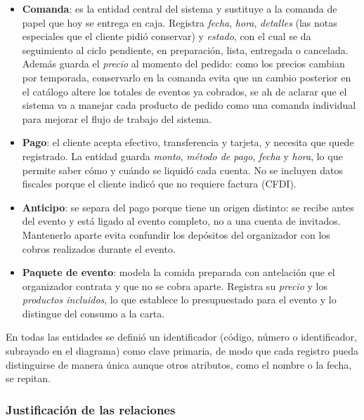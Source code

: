 \begin{itemize}
    \item \textbf{Comanda}: es la entidad central del sistema y sustituye a la comanda de papel que hoy se entrega en caja. Registra \emph{fecha}, \emph{hora}, \emph{detalles} (las notas especiales que el cliente pidió conservar) y \emph{estado}, con el cual se da seguimiento al ciclo pendiente, en preparación, lista, entregada o cancelada. Además guarda el \emph{precio} al momento del pedido: como los precios cambian por temporada, conservarlo en la comanda evita que un cambio posterior en el catálogo altere los totales de eventos ya cobrados, se ah de aclarar que el sistema va a manejar cada producto de pedido como una comanda individual para mejorar el flujo de trabajo del sistema.

    \item \textbf{Pago}: el cliente acepta efectivo, transferencia y tarjeta, y necesita que quede registrado. La entidad guarda \emph{monto}, \emph{método de pago}, \emph{fecha} y \emph{hora}, lo que permite saber cómo y cuándo se liquidó cada cuenta. No se incluyen datos fiscales porque el cliente indicó que no requiere factura (CFDI).

    \item \textbf{Anticipo}: se separa del pago porque tiene un origen distinto: se recibe antes del evento y está ligado al evento completo, no a una cuenta de invitados. Mantenerlo aparte evita confundir los depósitos del organizador con los cobros realizados durante el evento.

    \item \textbf{Paquete de evento}: modela la comida preparada con antelación que el organizador contrata y que no se cobra aparte. Registra su \emph{precio} y los \emph{productos incluidos}, lo que establece lo presupuestado para el evento y lo distingue del consumo a la carta.
\end{itemize}

En todas las entidades se definió un identificador (código, número o identificador, subrayado en el diagrama) como clave primaria, de modo que cada registro pueda distinguirse de manera única aunque otros atributos, como el nombre o la fecha, se repitan.

\subsubsection{Justificación de las relaciones}


